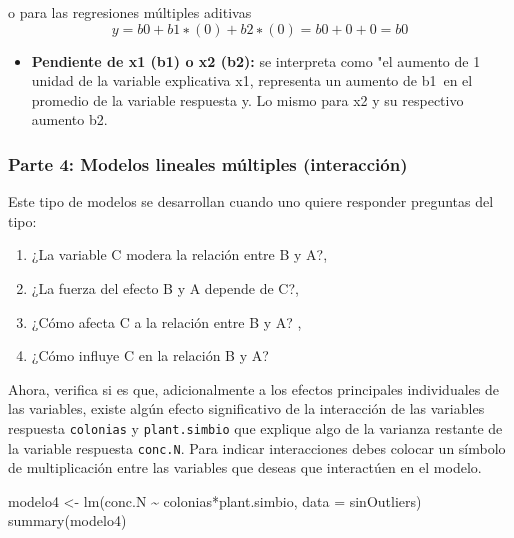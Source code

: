 \documentclass[
]{article}
\newenvironment{Shaded}{}{}
\newcommand{\AttributeTok}[1]{\textcolor[rgb]{0.49,0.56,0.16}{#1}}
\newcommand{\FunctionTok}[1]{\textcolor[rgb]{0.02,0.16,0.49}{#1}}
\newcommand{\NormalTok}[1]{#1}
\newcommand{\OtherTok}[1]{\textcolor[rgb]{0.00,0.44,0.13}{#1}}
\newcommand{\SpecialCharTok}[1]{\textcolor[rgb]{0.25,0.44,0.63}{#1}}
\providecommand{\tightlist}{%
  \setlength{\itemsep}{0pt}\setlength{\parskip}{0pt}}
\begin{document}
o para las regresiones múltiples aditivas\[
y=b0+b1∗(0)+b2∗(0) = b0+0+0 = b0  
\]

\begin{itemize}
\tightlist
\item
  \textbf{Pendiente de x1 (b1) o x2 (b2):} se interpreta como "el
  aumento de 1 unidad de la variable explicativa x1, representa un
  aumento de b1~en el promedio de la variable respuesta y. Lo mismo para
  x2 y su respectivo aumento b2.
\end{itemize}

\hypertarget{parte-4-modelos-lineales-muxfaltiples-interacciuxf3n}{%
\subsubsection{\texorpdfstring{\textbf{Parte 4: Modelos lineales
múltiples
(interacción)}}{Parte 4: Modelos lineales múltiples (interacción)}}\label{parte-4-modelos-lineales-muxfaltiples-interacciuxf3n}}

Este tipo de modelos se desarrollan cuando uno quiere responder
preguntas del tipo:

\begin{enumerate}
\def\labelenumi{\arabic{enumi}.}
\item
  ¿La variable C modera la relación entre B y A?,
\item
  ¿La fuerza del efecto B y A depende de C?,
\item
  ¿Cómo afecta C a la relación entre B y A? ,
\item
  ¿Cómo influye C en la relación B y A?
\end{enumerate}

Ahora, verifica si es que, adicionalmente a los efectos principales
individuales de las variables, existe algún efecto significativo de la
interacción de las variables respuesta \texttt{colonias} y
\texttt{plant.simbio} que explique algo de la varianza restante de la
variable respuesta \texttt{conc.N}. Para indicar interacciones debes
colocar un símbolo de multiplicación entre las variables que deseas que
interactúen en el modelo.

\begin{Shaded}
\begin{Highlighting}[]
\NormalTok{modelo4 }\OtherTok{\textless{}{-}} \FunctionTok{lm}\NormalTok{(conc.N }\SpecialCharTok{\textasciitilde{}}\NormalTok{ colonias}\SpecialCharTok{*}\NormalTok{plant.simbio, }\AttributeTok{data =}\NormalTok{ sinOutliers)}
\FunctionTok{summary}\NormalTok{(modelo4)}
\end{Highlighting}
\end{Shaded}
\end{document}
